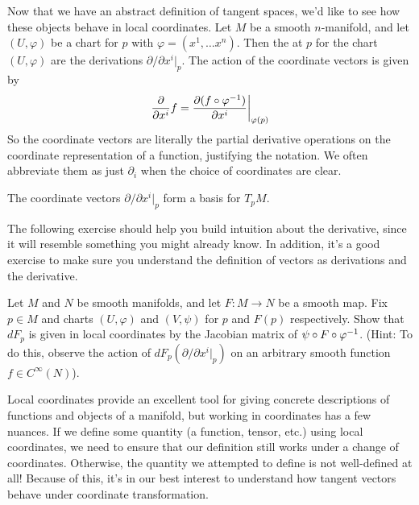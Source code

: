 Now that we have an abstract definition of tangent spaces, we'd like to see how
these objects behave in local coordinates. Let $M$ be a smooth $n$-manifold,
and let $(U,\varphi)$ be a chart for $p$ with $\varphi = (x^1 ,\ldots x^n)$.
Then the  at $p$ for the chart $(U, \varphi)$ are the
derivations $\partial/\partial x^i\vert_p$. The action of the coordinate
vectors is given by
$$\frac{\partial}{\partial x^i}f =
\frac{\partial (f \circ \varphi^{-1})}{\partial x^i}\bigg\vert_{\varphi(p)} $$
So the coordinate vectors are literally the partial derivative operations on
the coordinate representation of a function, justifying the notation. We often
abbreviate them as just $\partial_i$ when the choice of coordinates are clear.
%
\begin{thm}
	The coordinate vectors $\partial/ \partial x^i \vert_p$ form a basis
	for $T_pM$.
\end{thm}
%
The following exercise should help you build intuition about the derivative,
since it will resemble something you might already know. In addition, it's
a good exercise to make sure you understand the definition of vectors as
derivations and the derivative.
%
\begin{exer}
Let $M$ and $N$ be smooth manifolds, and let $F : M \to N$ be a smooth map.
Fix $p \in M$ and charts $(U, \varphi)$ and $(V, \psi)$ for $p$ and $F(p)$
respectively. Show that $dF_p$ is given in local coordinates by the Jacobian
matrix of $\psi \circ F \circ \varphi^{-1}$. (Hint: To do this, observe
the action of $dF_p(\partial /\partial x^i\vert_p)$ on an arbitrary smooth
function $f \in C^\infty(N)$).
\end{exer}
%
Local coordinates provide an excellent tool for giving concrete descriptions
of functions and objects of a manifold, but working in coordinates has a few
nuances. If we define some quantity (a function, tensor, etc.) using local
coordinates, we need to ensure that our definition still works under a change
of coordinates. Otherwise, the quantity we attempted to define is not
well-defined at all! Because of this, it's in our best interest to understand
how tangent vectors behave under coordinate transformation. \\

